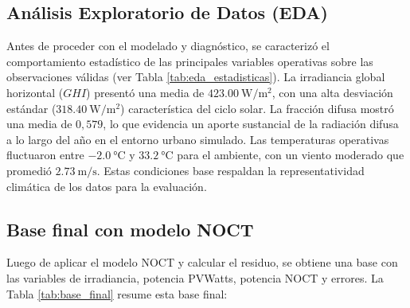 \documentclass[12pt, letterpaper]{article}
\begin{document}
\subsection{An\'alisis Exploratorio de Datos (EDA)}

Antes de proceder con el modelado y diagn\'ostico, se caracteriz\'o el comportamiento estad\'istico de las principales variables operativas sobre las observaciones v\'alidas (ver Tabla \ref{tab:eda_estadisticas}). La irradiancia global horizontal (\(GHI\)) present\'o una media de \(\SI{423.00}{\watt\per\square\meter}\), con una alta desviaci\'on est\'andar (\(\SI{318.40}{\watt\per\square\meter}\)) caracter\'istica del ciclo solar. La fracci\'on difusa mostr\'o una media de \(0{,}579\), lo que evidencia un aporte sustancial de la radiaci\'on difusa a lo largo del a\~no en el entorno urbano simulado. Las temperaturas operativas fluctuaron entre \(\SI{-2.0}{\celsius}\) y \(\SI{33.2}{\celsius}\) para el ambiente, con un viento moderado que promedi\'o \(\SI{2.73}{\meter\per\second}\). Estas condiciones base respaldan la representatividad clim\'atica de los datos para la evaluaci\'on.

\begin{table}[H]
\centering
\caption{Estad\'isticas descriptivas de las variables principales en las observaciones v\'alidas.}
\label{tab:eda_estadisticas}
\end{table}

\subsection{Base final con modelo NOCT}

Luego de aplicar el modelo NOCT y calcular el residuo, se obtiene una base con las variables de irradiancia, potencia PVWatts, potencia NOCT y errores. La Tabla \ref{tab:base_final} resume esta base final:
\end{document}
